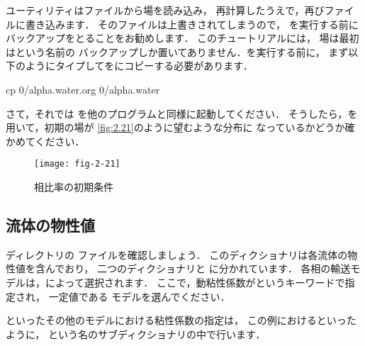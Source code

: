 %
%
ユーティリティはファイルから場を読み込み，
再計算したうえで，再びファイルに書き込みます．
そのファイルは上書きされてしまうので，
を実行する前にバックアップをとることをお勧めします．
このチュートリアルには，
場は最初はという名前の
バックアップしか置いてありません．を実行する前に，
まず以下のようにタイプしてをにコピーする必要があります．
\begin{OFverbatim}[terminal]
cp 0/alpha.water.org 0/alpha.water
\end{OFverbatim}

さて，それでは
%
%
を他のプログラムと同様に起動してください．
そうしたら，を用いて，初期の場が
\autoref{fig:2.21}のように望むような分布に
なっているかどうか確かめてください．


\begin{figure}[ht]
 \texttt{[image: fig-2-21]}
 \caption{相比率の初期条件}
 \label{fig:2.21}
\end{figure}


\subsection{流体の物性値}
\label{ssec:2.3.4}
ディレクトリの
%
%
ファイルを確認しましょう．
このディクショナリは各流体の物性値を含んでおり，
二つのディクショナリと
に分かれています．
各相の輸送モデルは，によって選択されます．
ここで，動粘性係数がというキーワードで指定され，
一定値である
%
%
モデルを選んでください．

%
%
といったその他のモデルにおける粘性係数の指定は，
この例におけるといったように，
という名のサブディクショナリの中で行います．

